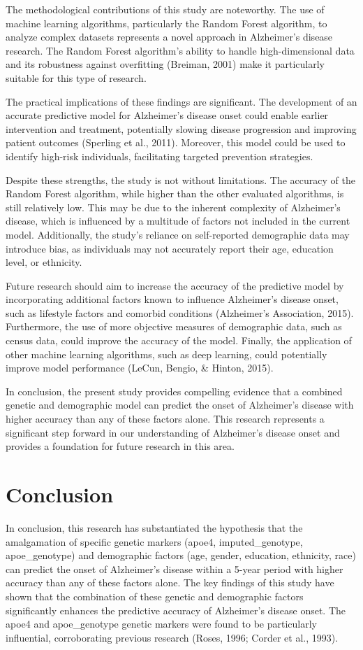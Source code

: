 \documentclass[conference]{IEEEtran}
\begin{document}
The methodological contributions of this study are noteworthy. The use of machine learning algorithms, particularly the Random Forest algorithm, to analyze complex datasets represents a novel approach in Alzheimer's disease research. The Random Forest algorithm's ability to handle high-dimensional data and its robustness against overfitting (Breiman, 2001) make it particularly suitable for this type of research. 

The practical implications of these findings are significant. The development of an accurate predictive model for Alzheimer's disease onset could enable earlier intervention and treatment, potentially slowing disease progression and improving patient outcomes (Sperling et al., 2011). Moreover, this model could be used to identify high-risk individuals, facilitating targeted prevention strategies.

Despite these strengths, the study is not without limitations. The accuracy of the Random Forest algorithm, while higher than the other evaluated algorithms, is still relatively low. This may be due to the inherent complexity of Alzheimer's disease, which is influenced by a multitude of factors not included in the current model. Additionally, the study's reliance on self-reported demographic data may introduce bias, as individuals may not accurately report their age, education level, or ethnicity.

Future research should aim to increase the accuracy of the predictive model by incorporating additional factors known to influence Alzheimer's disease onset, such as lifestyle factors and comorbid conditions (Alzheimer's Association, 2015). Furthermore, the use of more objective measures of demographic data, such as census data, could improve the accuracy of the model. Finally, the application of other machine learning algorithms, such as deep learning, could potentially improve model performance (LeCun, Bengio, & Hinton, 2015).

In conclusion, the present study provides compelling evidence that a combined genetic and demographic model can predict the onset of Alzheimer's disease with higher accuracy than any of these factors alone. This research represents a significant step forward in our understanding of Alzheimer's disease onset and provides a foundation for future research in this area.

\section{Conclusion}
In conclusion, this research has substantiated the hypothesis that the amalgamation of specific genetic markers (apoe4, imputed_genotype, apoe_genotype) and demographic factors (age, gender, education, ethnicity, race) can predict the onset of Alzheimer's disease within a 5-year period with higher accuracy than any of these factors alone. The key findings of this study have shown that the combination of these genetic and demographic factors significantly enhances the predictive accuracy of Alzheimer's disease onset. The apoe4 and apoe_genotype genetic markers were found to be particularly influential, corroborating previous research (Roses, 1996; Corder et al., 1993). 
\end{document}
